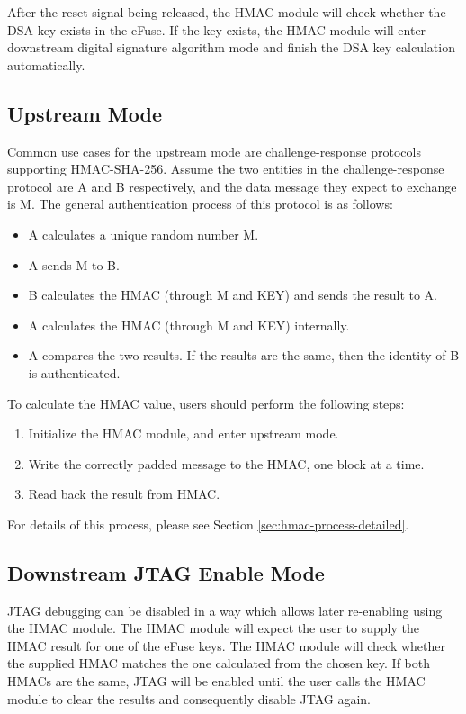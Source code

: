 \documentclass[main\_\_EN.tex]{subfiles}
\begin{document}
After the reset signal being released, the HMAC module will check whether the DSA key exists in the eFuse. If the key exists, the HMAC module will enter downstream digital signature algorithm mode and finish the DSA key calculation automatically.

\subsection{Upstream Mode}
Common use cases for the upstream mode are challenge-response protocols supporting HMAC-SHA-256.
Assume the two entities in the challenge-response protocol are A and B respectively, and the data message they expect to exchange is M. The general authentication process of this protocol is as follows:

\begin{itemize}
    \item A calculates a unique random number M.
    \item A sends M to B.
    \item B calculates the HMAC (through M and KEY) and sends the result to A.
    \item A calculates the HMAC (through M and KEY) internally.
    \item A compares the two results. If the results are the same, then the identity of B is authenticated.
\end{itemize}

To calculate the HMAC value, users should perform the following steps:

\begin{enumerate}
    \item Initialize the HMAC module, and enter upstream mode.
    \item Write the correctly padded message to the HMAC, one block at a time.
    \item Read back the result from HMAC.
\end{enumerate}

For details of this process, please see Section \ref{sec:hmac-process-detailed}.


\subsection{Downstream JTAG Enable Mode}

JTAG debugging can be disabled in a way which allows later re-enabling using the HMAC module. The HMAC module will expect the user to supply the HMAC result for one of the eFuse keys. The HMAC module will check whether the supplied HMAC matches the one calculated from the chosen key. If both HMACs are the same, JTAG will be enabled until the user calls the HMAC module to clear the results and consequently disable JTAG again.
\end{document}
